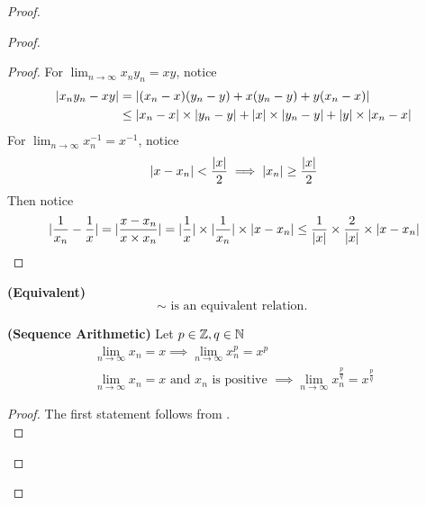 \documentclass{report}
\begin{document}
\begin{proof}
\begin{proof}
\begin{proof}
For $\lim_{n\to\infty} x_ny_n=xy$, notice
\begin{align}
  |x_ny_n-xy|&=|(x_n-x)(y_n-y)+x(y_n-y)+y(x_n-x)|\\
  &\leq |x_n-x|\times|y_n-y|+|x|\times|y_n-y|+|y|\times|x_n-x|
\end{align}
For $\lim_{n\to\infty}x_n^{-1}=x^{-1}$, notice 
\begin{equation}
  |x-x_n|<\frac{|x|}{2}\implies  |x_n|\geq \frac{|x|}{2}
\end{equation}
Then notice
\begin{equation}
|\frac{1}{x_n}-\frac{1}{x}|=|\frac{x-x_n}{x\times x_n}|=|\frac{1}{x}|\times |\frac{1}{x_n}|\times |x-x_n|\leq \frac{1}{|x|}\times \frac{2}{|x|}\times |x-x_n|
\end{equation}
\end{proof}
\begin{corollary}
\label{4.1.7}
\textbf{(Equivalent)} 
\begin{equation}
\sim\text{ is an equivalent relation. }
\end{equation}
\end{corollary}
\begin{corollary}
\label{4.1.8}
\textbf{(Sequence Arithmetic)} Let $p\in\mathbb{Z},q\in\mathbb{N}$
\begin{gather}
\lim_{n\to\infty} x_n=x\implies \lim_{n\to\infty} x_n^p=x^p\\
\lim_{n\to\infty} x_n=x\text{ and }x_n\text{ is positive }\implies \lim_{n\to\infty} x_n^{\frac{p}{q}}=x^{\frac{p}{q}}
\end{gather}
\end{corollary}
\begin{proof}
The first statement follows from .\\


\end{proof}
\end{proof}
\end{proof}
\end{document}
